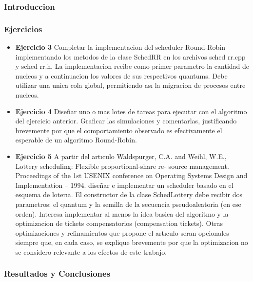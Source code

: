 
\subsubsection{Introduccion}

\subsubsection{Ejercicios}
\begin{itemize}
 \item 
\textbf{Ejercicio 3}  Completar la implementacion del scheduler Round-Robin implementando los
metodos de la clase SchedRR en los archivos sched rr.cpp y sched rr.h. La implementacion
recibe como primer parametro la cantidad de nucleos y a continuacion los valores de sus
respectivos quantums. Debe utilizar una unica cola global, permitiendo ası la migracion de
procesos entre nucleos.
\item \textbf{Ejercicio 4} Diseñar uno o mas lotes de tareas para ejecutar con el algoritmo del ejercicio
anterior. Graficar las simulaciones y comentarlas, justificando brevemente por que el comportamiento 
observado es efectivamente el esperable de un algoritmo Round-Robin.
\item \textbf{Ejercicio 5} A partir del artıculo
Waldspurger, C.A. and Weihl, W.E., Lottery scheduling: Flexible proportional-share re-
source management. Proceedings of the 1st USENIX conference on Operating Systems
Design and Implementation – 1994.
diseñar e implementar un scheduler basado en el esquema de loterıa. El constructor de la
clase SchedLottery debe recibir dos parametros: el quantum y la semilla de la secuencia
pseudoaleatoria (en ese orden). Interesa implementar al menos la idea basica del algoritmo
y la optimizacion de tickets compensatorios (compensation tickets). Otras optimizaciones y
refinamientos que propone el artıculo seran opcionales siempre que, en cada caso, se explique
brevemente por que la optimizacion no se considero relevante a los efectos de este trabajo.

\end{itemize}


\subsubsection{Resultados y Conclusiones}
